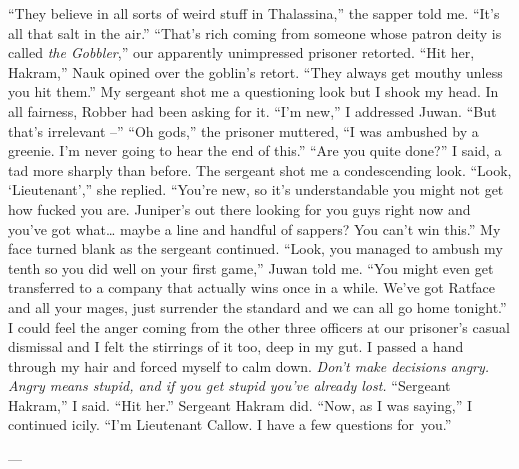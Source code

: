 \documentclass[12pt, openany]{book}
\begin{document}
“They believe in all sorts of weird stuff in Thalassina,” the sapper told me. “It’s all that salt in the air.”
“That’s rich coming from someone whose patron deity is called \textit{the Gobbler},” our apparently unimpressed prisoner retorted.
“Hit her, Hakram,” Nauk opined over the goblin’s retort. “They always get mouthy unless you hit them.”
My sergeant shot me a questioning look but I shook my head. In all fairness, Robber had been asking for it.
“I’m new,” I addressed Juwan. “But that’s irrelevant –”
“Oh gods,” the prisoner muttered, “I was ambushed by a greenie. I’m never going to hear the end of this.”
“Are you quite done?” I said, a tad more sharply than before.
The sergeant shot me a condescending look.
“Look, ‘Lieutenant’,” she replied. “You’re new, so it’s understandable you might not get how fucked you are. Juniper’s out there looking for you guys right now and you’ve got what… maybe a line and handful of sappers? You can’t win this.”
My face turned blank as the sergeant continued.
“Look, you managed to ambush my tenth so you did well on your first game,” Juwan told me. “You might even get transferred to a company that actually wins once in a while. We’ve got Ratface and all your mages, just surrender the standard and we can all go home tonight.”
I could feel the anger coming from the other three officers at our prisoner’s casual dismissal and I felt the stirrings of it too, deep in my gut. I passed a hand through my hair and forced myself to calm down. \textit{Don’t make decisions angry. Angry means stupid, and if you get stupid you’ve already lost.}
“Sergeant Hakram,” I said. “Hit her.”
Sergeant Hakram did.
“Now, as I was saying,” I continued icily. “I’m Lieutenant Callow. I have a few questions for you.”

—
\end{document}
